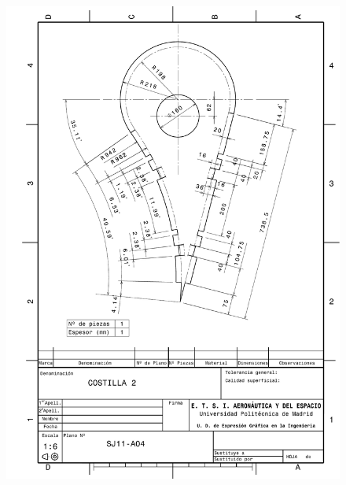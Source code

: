 \begin{figure}
    \centering
    \includegraphics[width=\linewidth]{Figures//Planos/C2.pdf}
\end{figure}

